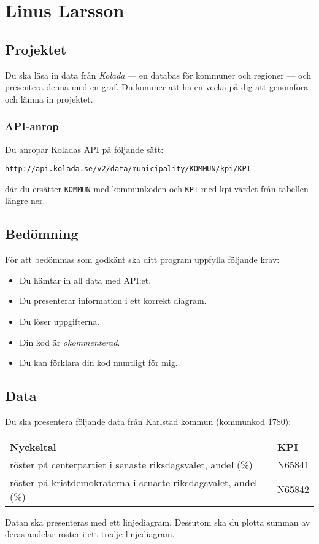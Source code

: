 \section{Linus Larsson}

\subsection{Projektet}

Du ska läsa in data från \textit{Kolada} --- en databas för kommuner och regioner --- och presentera denna med en graf. Du kommer att ha en vecka på dig att genomföra och lämna in projektet.

\subsubsection{API-anrop}

Du anropar Koladas API på följande sätt:

\texttt{http://api.kolada.se/v2/data/municipality/KOMMUN/kpi/KPI}

\noindent där du ersätter \texttt{KOMMUN} med kommunkoden och \texttt{KPI} med kpi-värdet från tabellen längre ner.

\subsection{Bedömning}

För att bedömmas som godkänt ska ditt program uppfylla följande krav:

\begin{itemize}
	\item Du hämtar in all data med API:et.
	\item Du presenterar information i ett korrekt diagram.
	\item Du löser uppgifterna.
	\item Din kod är \textit{okommenterad}.
	\item Du kan förklara din kod muntligt för mig.
\end{itemize}

\subsection{Data}

Du ska presentera följande data från Karlstad kommun (kommunkod 1780):

\begin{center}
	\begin{tabular}{ll}
		\rowcolor{blue!25}
		\textbf{Nyckeltal} & \textbf{KPI}\\
		röster på centerpartiet i senaste riksdagsvalet, andel (\%) & N65841\\
		röster på kristdemokraterna i senaste riksdagsvalet, andel (\%) & N65842
	\end{tabular}
\end{center}

Datan ska presenteras med ett linjediagram. Dessutom ska du plotta summan av deras andelar röster i ett tredje linjediagram.

\clearpage